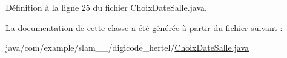 Définition à la ligne 25 du fichier Choix\+Date\+Salle.\+java.



La documentation de cette classe a été générée à partir du fichier suivant \+:\begin{DoxyCompactItemize}
\item 
java/com/example/slam\+\_\+\_/digicode\+\_\+hertel/\hyperlink{_choix_date_salle_8java}{Choix\+Date\+Salle.\+java}\end{DoxyCompactItemize}
